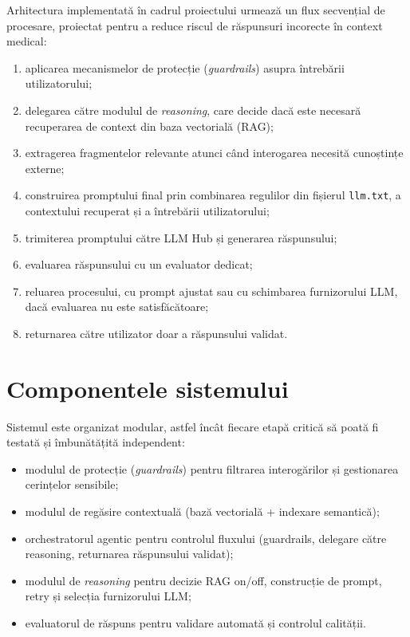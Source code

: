 \documentclass[12pt, a4paper, oneside, romanian]{teza-upb}
\begin{document}
Arhitectura implementată în cadrul proiectului urmează un flux secvențial de procesare, proiectat pentru a reduce riscul de răspunsuri incorecte în context medical:
\begin{enumerate}
    \item aplicarea mecanismelor de protecție (\textit{guardrails}) asupra întrebării utilizatorului;
    \item delegarea către modulul de \textit{reasoning}, care decide dacă este necesară recuperarea de context din baza vectorială (RAG);
    \item extragerea fragmentelor relevante atunci când interogarea necesită cunoștințe externe;
    \item construirea promptului final prin combinarea regulilor din fișierul \texttt{llm.txt}, a contextului recuperat și a întrebării utilizatorului;
    \item trimiterea promptului către LLM Hub și generarea răspunsului;
    \item evaluarea răspunsului cu un evaluator dedicat;
    \item reluarea procesului, cu prompt ajustat sau cu schimbarea furnizorului LLM, dacă evaluarea nu este satisfăcătoare;
    \item returnarea către utilizator doar a răspunsului validat.
\end{enumerate}

\section{Componentele sistemului}
Sistemul este organizat modular, astfel încât fiecare etapă critică să poată fi testată și îmbunătățită independent:
\begin{itemize}
    \item modulul de protecție (\textit{guardrails}) pentru filtrarea interogărilor și gestionarea cerințelor sensibile;
    \item modulul de regăsire contextuală (bază vectorială + indexare semantică);
    \item orchestratorul agentic pentru controlul fluxului (guardrails, delegare către reasoning, returnarea răspunsului validat);
    \item modulul de \textit{reasoning} pentru decizie RAG on/off, construcție de prompt, retry și selecția furnizorului LLM;
    \item evaluatorul de răspuns pentru validare automată și controlul calității.
\end{itemize}
\end{document}
